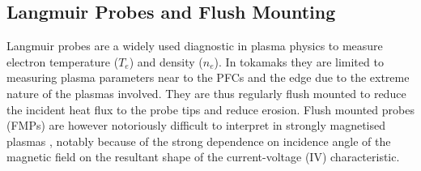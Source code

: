 \documentclass[a4paper, 11pt]{article} %
\begin{document}


\subsection{\label{subsec:lps}Langmuir Probes and Flush Mounting}
	Langmuir probes are a widely used diagnostic in plasma physics to measure electron temperature ($T_e$) and density ($n_e$). 
	In tokamaks they are limited to measuring plasma parameters near to the PFCs and the edge due to the extreme nature of the plasmas involved. 
	They are thus regularly flush mounted to reduce the incident heat flux to the probe tips and reduce erosion. 
	Flush mounted probes (FMPs) are however notoriously difficult to interpret in strongly magnetised plasmas \cite{Matthews1994}, notably because of the strong dependence on incidence angle of the magnetic field on the resultant shape of the current-voltage (IV) characteristic.
	
\end{document}

